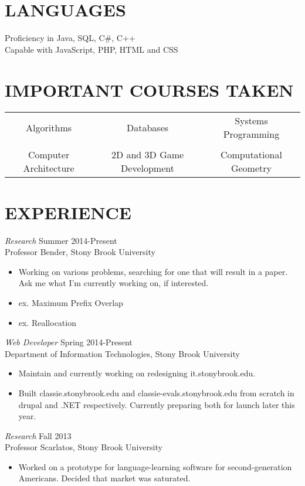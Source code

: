\documentclass[margin]{res}
\begin{document}
\begin{resume}
 
\section{LANGUAGES} Proficiency in Java, SQL, C\#, C++\\
Capable with JavaScript, PHP, HTML and CSS \\

\section{IMPORTANT COURSES TAKEN}
\begin{tabular}{c c c}
Algorithms & Databases & Systems Programming \\
&&\\
Computer Architecture & 2D and 3D Game Development & Computational Geometry\\
\end{tabular}
               

 
\section{EXPERIENCE} 
                {\sl Research} \hfill           Summer 2014-Present \\
                Professor Bender, Stony Brook University
                \begin{itemize} \itemsep -2pt
                \item Working on various problems, searching for one that will result in a paper. Ask me what I'm currently working on, if interested.
                \item ex. Maximum Prefix Overlap
                \item ex. Reallocation
                \end{itemize}
                {\sl Web Developer} \hfill    Spring 2014-Present \\
                Department of Information Technologies, Stony Brook University
                \begin{itemize} \itemsep -2pt
                \item Maintain and currently working on redesigning it.stonybrook.edu.
                \item Built classie.stonybrook.edu and classie-evals.stonybrook.edu from scratch in drupal and .NET respectively. Currently preparing both for launch later this year.
                \end{itemize}
                {\sl Research} \hfill           Fall 2013 \\
                Professor Scarlatos, Stony Brook University
                 \begin{itemize}  \itemsep -2pt %
                 \item Worked on a prototype for language-learning software for second-generation Americans. Decided that market was saturated.
                 \end{itemize} 


\end{resume}
\end{document}
